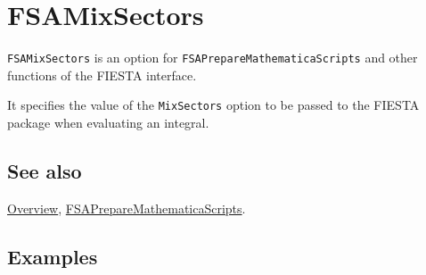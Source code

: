 \documentclass[../FeynHelpersManual.tex]{subfiles}
\begin{document}
\hypertarget{fsamixsectors}{
\section{FSAMixSectors}\label{fsamixsectors}}

\texttt{FSAMixSectors} is an option for
\texttt{FSAPrepareMathematicaScripts} and other functions of the FIESTA
interface.

It specifies the value of the \texttt{MixSectors} option to be passed to
the FIESTA package when evaluating an integral.

\subsection{See also}

\hyperlink{toc}{Overview},
\hyperlink{fsapreparemathematicascripts}{FSAPrepareMathematicaScripts}.

\subsection{Examples}
\end{document}
